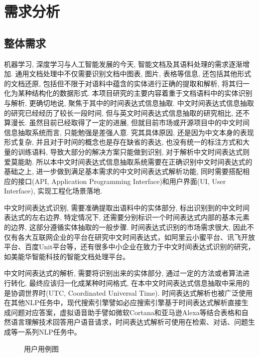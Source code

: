 
\chapter{需求分析}

\section{整体需求}

机器学习, 深度学习与人工智能发展的今天, 智能文档及其语料处理的需求逐渐增加.
通用文档处理中不仅需要识别文档中图表, 图片, 表格等信息, 还包括其他形式的文档还原, 包括但不限于对语料中蕴含的实体进行正确的提取和解析, 将其归一化为某种结构化的数据形式.
本项目研究的主要内容着重于文档语料中的实体识别与解析, 更确切地说, 聚焦于其中的时间表达式信息抽取.
中文时间表达式信息抽取的研究已经经历了较长一段时间, 但与英文时间表达式信息抽取的研究相比, 还不算漫长.
虽然目前已经取得了一定的进展, 但就目前市场或开源项目中的中文时间信息抽取系统而言, 只能勉强是差强人意.
究其具体原因, 还是因为中文本身的表现形式复杂, 并且对于时间的概念也是存在缺省的表达, 也没有统一的标注方式和大量的训练语料, 导致大部分的解决方案只能做到识别, 对于解析中文时间表达式则爱莫能助.
所以本中文时间表达式信息抽取系统需要在正确识别中文时间表达式的基础之上, 进一步做到满足基本需求的中文时间表达式解析功能, 同时需要搭配相应的接口(API, Application Programming Interface)和用户界面(UI, User Interface), 实现工程化场景落地.

中文时间表达式识别, 需要准确提取出语料中的实体部分, 标出识别到的中文时间表达式的左右边界, 特定情况下, 还需要分别标识一个时间表达式内部的基本元素的边界, 这部分遵循实体抽取的一般步骤.
时间表达式识别的市场需求很大, 因此不仅有各大互联网企业的平台在研究中文时间表达式，如阿里云小蜜平台、讯飞开放平台、百度Unit平台等，还有很多中小企业在致力于中文时间表达式识别的研究，如美能华智能科技的智能文档处理平台。

中文时间表达式的解析, 需要将识别出来的实体部分, 通过一定的方法或者算法进行转化, 最终应该归一化成某种时间格式, 在本中文时间表达式信息抽取中采用的是协调世界时(UTC, Coordinated Universal Time).
时间表达式解析也被广泛使用在其他NLP任务中，现代搜索引擎譬如必应搜索引擎基于时间表达式解析直接生成问题对应答案，虚拟语音助手譬如微软Cortana和亚马逊Alexa等结合表格和自然语言理解技术回答用户语音请求，时间表达式解析可使用在检索、对话、问题生成等一系列NLP任务中。

\begin{figure}[h]
    \centering
    \caption{用户用例图}
    \label{fig:usecase}
\end{figure}



